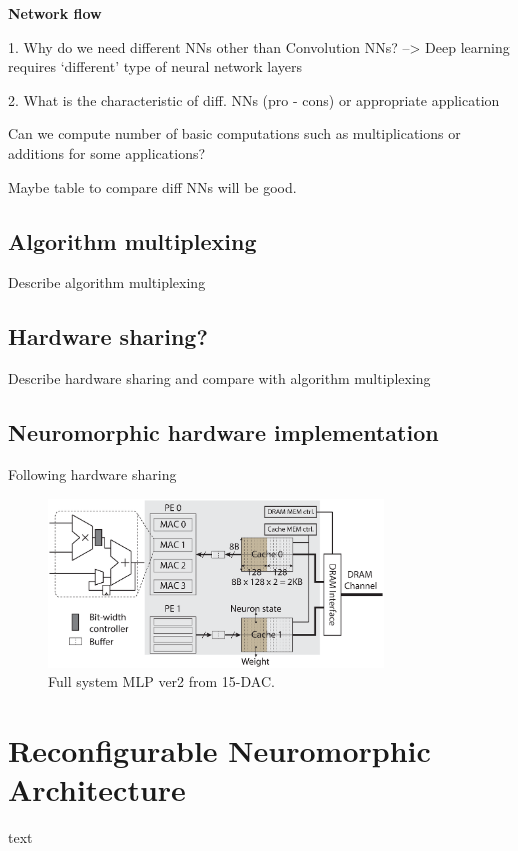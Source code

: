 \documentclass[pageno]{jpaper}
\begin{document}
\textbf{Network flow}




1. Why do we need different NNs other than Convolution NNs? --> Deep learning requires `different' type of neural network layers

2. What is the characteristic of diff. NNs (pro - cons) or appropriate application

Can we compute number of basic computations such as multiplications or additions for some applications? 

Maybe table to compare diff NNs will be good.

\subsection{Algorithm multiplexing} \label{sub_sec:alg_mux}
Describe algorithm multiplexing

\subsection{Hardware sharing?} \label{sub_sec:hw_share}
Describe hardware sharing and compare with algorithm multiplexing

\subsection{Neuromorphic hardware implementation}\label{sub_sec:Previous works hardware}
Following hardware sharing



\begin{figure}[!t]
\centering
\includegraphics[width=3.5in]{fig/Full_system_MLP_ver2.eps}
\caption{Full system MLP ver2 from 15-DAC.}
\label{fig:MLP_system}
\end{figure}


\section{Reconfigurable Neuromorphic Architecture}\label{sec:architecture}
text
\end{document}

